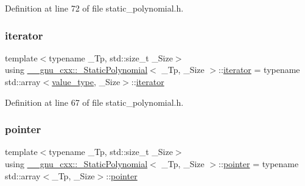 Definition at line 72 of file static\+\_\+polynomial.\+h.

\mbox{\label{class____gnu__cxx_1_1__StaticPolynomial_af042e6cdb307879fbfe357c13a843c7c}} 
\subsubsection{\texorpdfstring{iterator}{iterator}}
{\footnotesize\ttfamily template$<$typename \+\_\+\+Tp, std\+::size\+\_\+t \+\_\+\+Size$>$ \\
using \hyperlink{class____gnu__cxx_1_1__StaticPolynomial}{\+\_\+\+\_\+gnu\+\_\+cxx\+::\+\_\+\+Static\+Polynomial}$<$ \+\_\+\+Tp, \+\_\+\+Size $>$\+::\hyperlink{class____gnu__cxx_1_1__StaticPolynomial_af042e6cdb307879fbfe357c13a843c7c}{iterator} =  typename std\+::array$<$\hyperlink{class____gnu__cxx_1_1__StaticPolynomial_aad5f3d6d5876b6926b30724aeac649d6}{value\+\_\+type}, \+\_\+\+Size$>$\+::\hyperlink{class____gnu__cxx_1_1__StaticPolynomial_af042e6cdb307879fbfe357c13a843c7c}{iterator}}



Definition at line 67 of file static\+\_\+polynomial.\+h.

\mbox{\label{class____gnu__cxx_1_1__StaticPolynomial_a7d03f6214af023bf7b7587c36436f4ec}} 
\subsubsection{\texorpdfstring{pointer}{pointer}}
{\footnotesize\ttfamily template$<$typename \+\_\+\+Tp, std\+::size\+\_\+t \+\_\+\+Size$>$ \\
using \hyperlink{class____gnu__cxx_1_1__StaticPolynomial}{\+\_\+\+\_\+gnu\+\_\+cxx\+::\+\_\+\+Static\+Polynomial}$<$ \+\_\+\+Tp, \+\_\+\+Size $>$\+::\hyperlink{class____gnu__cxx_1_1__StaticPolynomial_a7d03f6214af023bf7b7587c36436f4ec}{pointer} =  typename std\+::array$<$\+\_\+\+Tp, \+\_\+\+Size$>$\+::\hyperlink{class____gnu__cxx_1_1__StaticPolynomial_a7d03f6214af023bf7b7587c36436f4ec}{pointer}}



